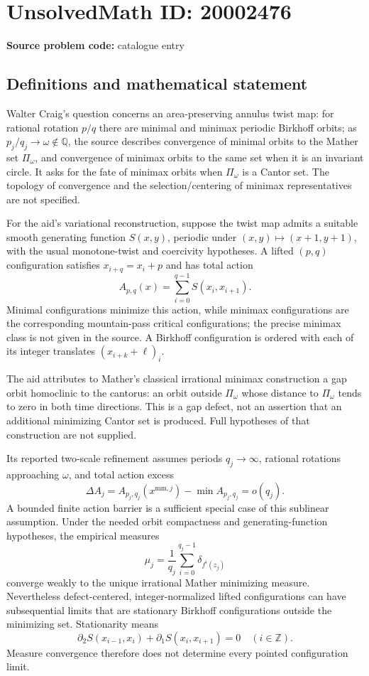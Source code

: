 \documentclass[11pt]{article}
\newcommand{\Z}{\mathbb{Z}}
\newcommand{\Q}{\mathbb{Q}}
\begin{document}
\section*{UnsolvedMath ID: 20002476}
\textbf{Source problem code:} catalogue entry
\subsection{Definitions and mathematical statement}
Walter Craig's question concerns an area-preserving annulus twist map: for rational rotation $p/q$ there are minimal and minimax periodic Birkhoff orbits; as $p_j/q_j\to\omega\notin\Q$, the source describes convergence of minimal orbits to the Mather set $\Pi_\omega$, and convergence of minimax orbits to the same set when it is an invariant circle. It asks for the fate of minimax orbits when $\Pi_\omega$ is a Cantor set. The topology of convergence and the selection/centering of minimax representatives are not specified.

For the aid's variational reconstruction, suppose the twist map admits a suitable smooth generating function $S(x,y)$, periodic under $(x,y)\mapsto(x+1,y+1)$, with the usual monotone-twist and coercivity hypotheses. A lifted $(p,q)$ configuration satisfies $x_{i+q}=x_i+p$ and has total action
\[
 A_{p,q}(x)=\sum_{i=0}^{q-1}S(x_i,x_{i+1}).
\]
Minimal configurations minimize this action, while minimax configurations are the corresponding mountain-pass critical configurations; the precise minimax class is not given in the source. A Birkhoff configuration is ordered with each of its integer translates $(x_{i+k}+\ell)_i$.

The aid attributes to Mather's classical irrational minimax construction a gap orbit homoclinic to the cantorus: an orbit outside $\Pi_\omega$ whose distance to $\Pi_\omega$ tends to zero in both time directions. This is a gap defect, not an assertion that an additional minimizing Cantor set is produced. Full hypotheses of that construction are not supplied.

Its reported two-scale refinement assumes periods $q_j\to\infty$, rational rotations approaching $\omega$, and total action excess
\[
 \Delta A_j=A_{p_j,q_j}(x^{\mathrm{mm},j})-
 \min A_{p_j,q_j}=o(q_j).
\]
A bounded finite action barrier is a sufficient special case of this sublinear assumption. Under the needed orbit compactness and generating-function hypotheses, the empirical measures
\[
 \mu_j=\frac1{q_j}\sum_{i=0}^{q_j-1}\delta_{f^i(z_j)}
\]
converge weakly to the unique irrational Mather minimizing measure. Nevertheless defect-centered, integer-normalized lifted configurations can have subsequential limits that are stationary Birkhoff configurations outside the minimizing set. Stationarity means
\[
 \partial_2S(x_{i-1},x_i)+\partial_1S(x_i,x_{i+1})=0\quad(i\in\Z).
\]
Measure convergence therefore does not determine every pointed configuration limit.
\end{document}
